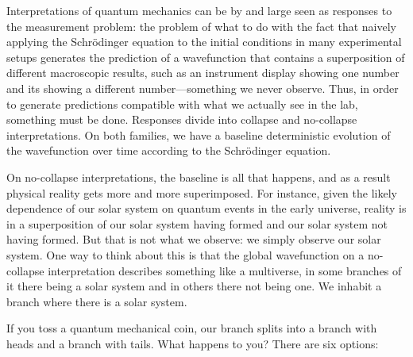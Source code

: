 Interpretations of quantum mechanics can be by and large seen as responses to the measurement problem: the problem of 
what to do with the fact that naively applying the Schr\"{o}dinger equation to the initial conditions in many experimental 
setups generates the prediction of a wavefunction that contains a superposition of different macroscopic results, such as 
an instrument display showing one number and its showing a different number---something we never observe. Thus, in order 
to generate predictions compatible with what we actually see in the lab, something must be done. Responses 
divide into collapse and no-collapse interpretations. On both families,
we have a baseline deterministic evolution of the wavefunction over time according to the Schr\"{o}dinger equation.

On no-collapse interpretations, the baseline is all that happens, and as a result physical reality gets more and more 
superimposed. For instance, given the likely dependence of our solar system on quantum events in the early universe,
reality is in a superposition of our solar system having formed and our solar system not having formed. But that is 
not what we observe: we simply observe our solar system. One way to think about this is that the global wavefunction 
on a no-collapse interpretation describes something like a multiverse, in some branches of it there being a solar system and 
in others there not being one. We inhabit a branch where there is a solar system. 

If you toss a quantum mechanical coin, our branch splits into a branch with heads and a branch with tails. What happens
to you? There are six options:

